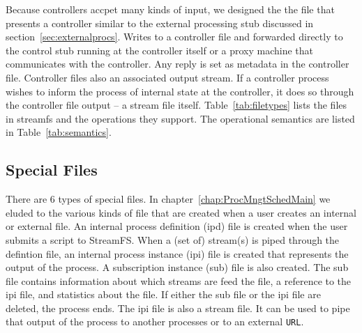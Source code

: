 Because controllers accpet many kinds of input, we designed the the file that presents a controller similar to the external processing stub discussed
in section~\ref{sec:externalprocs}.  Writes to a controller file and forwarded directly to the control stub running at the controller itself or a proxy
machine that communicates with the controller.  Any reply is set as metadata in the controller file.  Controller files also an associated output stream.
If a controller process wishes to inform the process of internal state at the controller, it does so through the controller file output --
a stream file itself.  Table~\ref{tab:filetypes} lists the files in streamfs and the operations they support.  The operational semantics
are listed in Table~\ref{tab:semantics}.



\subsection{Special Files}
There are 6 types of special files.  In chapter~\ref{chap:ProcMngtSchedMain} we eluded to the various kinds of file that are created
when a user creates an internal or external file.  An internal process definition (ipd) file is created when the user
submits a script to StreamFS.  When a (set of) stream(s) is piped through the defintion file, an internal process instance (ipi) file
is created that represents the output of the process.  A subscription instance (sub) file is also created.  The sub file contains
information about which streams are feed the file, a reference to the ipi file, and statistics about the file.  If either
the sub file or the ipi file are deleted, the process ends.  The ipi file is also a stream file.  It can be used to pipe that
output of the process to another processes or to an external \texttt{URL}.

